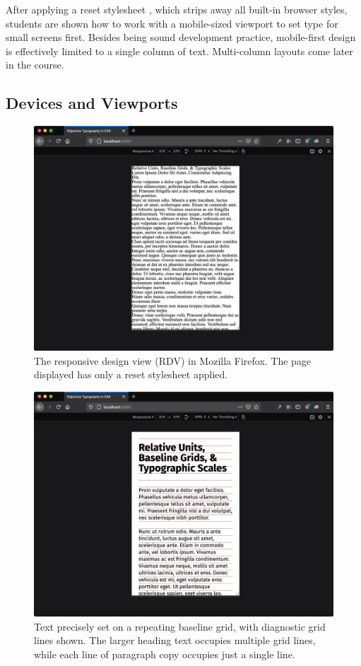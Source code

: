 \documentclass[sigplan,screen]{acmart}
\begin{document}
 After applying a reset stylesheet \cite{em:rc}, which strips away all built-in browser styles, students are shown how to work with a mobile-sized viewport to set type for small screens first. Besides being sound development practice, mobile-first design is effectively limited to a single column of text. Multi-column layouts come later in the course.

\subsection{Devices and Viewports}

\begin{figure}
  \includegraphics[width=\linewidth]{rdv}
  \caption{The responsive design view (RDV) in Mozilla Firefox. The  page displayed has only a reset stylesheet applied.}
  \label{fig:rdv}
\end{figure}

\begin{figure}
  \includegraphics[width=\linewidth]{rdv-narrow}
  \caption{Text precisely set on a repeating baseline grid, with diagnostic grid lines shown. The larger heading text occupies multiple grid lines, while each line of paragraph copy occupies just a single line.}
  \label{fig:rdv-narrow}
\end{figure}
\end{document}
